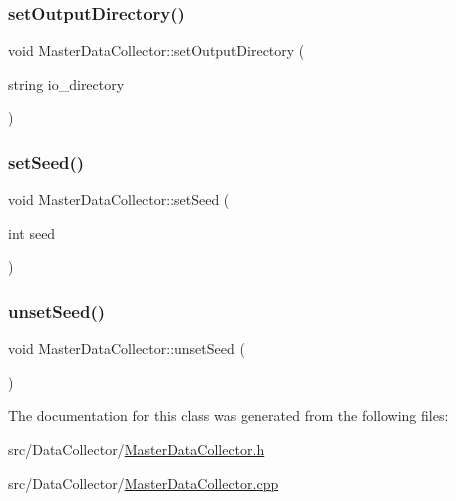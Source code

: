 \subsubsection{\texorpdfstring{set\+Output\+Directory()}{setOutputDirectory()}}
{\footnotesize\ttfamily void Master\+Data\+Collector\+::set\+Output\+Directory (\begin{DoxyParamCaption}\item[{string}]{io\+\_\+directory }\end{DoxyParamCaption})}

\mbox{\label{classMasterDataCollector_a87fcddba468aff96d324ef24bd97d2a1}} 
\subsubsection{\texorpdfstring{set\+Seed()}{setSeed()}}
{\footnotesize\ttfamily void Master\+Data\+Collector\+::set\+Seed (\begin{DoxyParamCaption}\item[{int}]{seed }\end{DoxyParamCaption})\hspace{0.3cm}{\ttfamily [static]}}

\mbox{\label{classMasterDataCollector_a0603f209d3d52d48d035c38f003abbb6}} 
\subsubsection{\texorpdfstring{unset\+Seed()}{unsetSeed()}}
{\footnotesize\ttfamily void Master\+Data\+Collector\+::unset\+Seed (\begin{DoxyParamCaption}{ }\end{DoxyParamCaption})\hspace{0.3cm}{\ttfamily [static]}}



The documentation for this class was generated from the following files\+:\begin{DoxyCompactItemize}
\item 
src/\+Data\+Collector/\mbox{\hyperlink{MasterDataCollector_8h}{Master\+Data\+Collector.\+h}}\item 
src/\+Data\+Collector/\mbox{\hyperlink{MasterDataCollector_8cpp}{Master\+Data\+Collector.\+cpp}}\end{DoxyCompactItemize}
